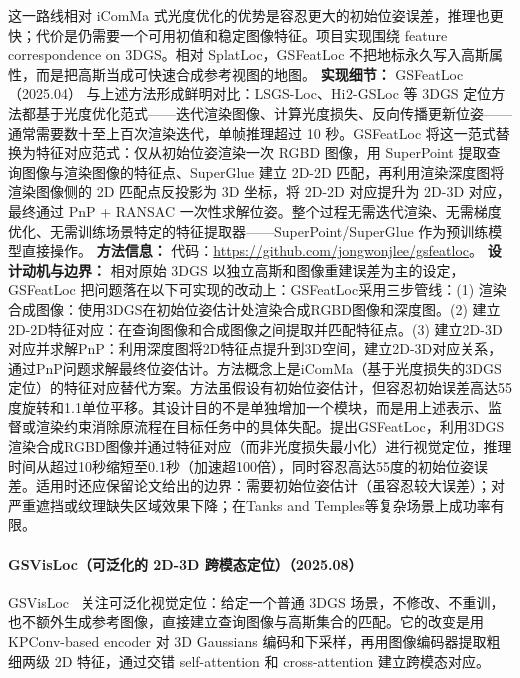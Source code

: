 这一路线相对 iComMa 式光度优化的优势是容忍更大的初始位姿误差，推理也更快；代价是仍需要一个可用初值和稳定图像特征。项目实现围绕 feature correspondence on 3DGS。相对 SplatLoc，GSFeatLoc 不把地标永久写入高斯属性，而是把高斯当成可快速合成参考视图的地图。
\textbf{实现细节：} GSFeatLoc（2025.04） 与上述方法形成鲜明对比：LSGS-Loc、Hi$^{}2$-GSLoc 等 3DGS 定位方法都基于光度优化范式——迭代渲染图像、计算光度损失、反向传播更新位姿——通常需要数十至上百次渲染迭代，单帧推理超过 10 秒。GSFeatLoc 将这一范式替换为特征对应范式：仅从初始位姿渲染一次 RGBD 图像，用 SuperPoint 提取查询图像与渲染图像的特征点、SuperGlue 建立 2D-2D 匹配，再利用渲染深度图将渲染图像侧的 2D 匹配点反投影为 3D 坐标，将 2D-2D 对应提升为 2D-3D 对应，最终通过 PnP + RANSAC 一次性求解位姿。整个过程无需迭代渲染、无需梯度优化、无需训练场景特定的特征提取器——SuperPoint/SuperGlue 作为预训练模型直接操作。
\textbf{方法信息：} 代码：\url{https://github.com/jongwonjlee/gsfeatloc}。
\textbf{设计动机与边界：} 相对原始 3DGS 以独立高斯和图像重建误差为主的设定，GSFeatLoc 把问题落在以下可实现的改动上：GSFeatLoc采用三步管线：(1) 渲染合成图像：使用3DGS在初始位姿估计处渲染合成RGBD图像和深度图。(2) 建立2D-2D特征对应：在查询图像和合成图像之间提取并匹配特征点。(3) 建立2D-3D对应并求解PnP：利用深度图将2D特征点提升到3D空间，建立2D-3D对应关系，通过PnP问题求解最终位姿估计。方法概念上是iComMa（基于光度损失的3DGS定位）的特征对应替代方案。方法虽假设有初始位姿估计，但容忍初始误差高达55度旋转和1.1单位平移。其设计目的不是单独增加一个模块，而是用上述表示、监督或渲染约束消除原流程在目标任务中的具体失配。提出GSFeatLoc，利用3DGS渲染合成RGBD图像并通过特征对应（而非光度损失最小化）进行视觉定位，推理时间从超过10秒缩短至0.1秒（加速超100倍），同时容忍高达55度的初始位姿误差。适用时还应保留论文给出的边界：需要初始位姿估计（虽容忍较大误差）；对严重遮挡或纹理缺失区域效果下降；在Tanks and Temples等复杂场景上成功率有限。
\paragraph{GSVisLoc（可泛化的 2D-3D 跨模态定位）（2025.08）}
GSVisLoc~\cite{2508_18242} 关注可泛化视觉定位：给定一个普通 3DGS 场景，不修改、不重训，也不额外生成参考图像，直接建立查询图像与高斯集合的匹配。它的改变是用 KPConv-based encoder 对 3D Gaussians 编码和下采样，再用图像编码器提取粗细两级 2D 特征，通过交错 self-attention 和 cross-attention 建立跨模态对应。

